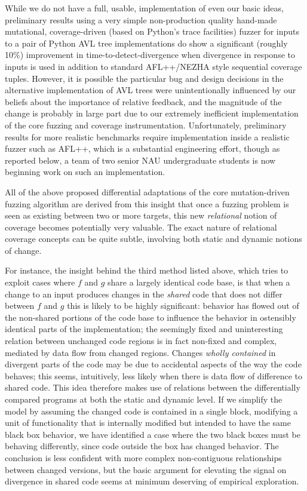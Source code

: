  While we do not have a full, usable, implementation of even our basic
 ideas,
 preliminary results using a very simple non-production quality hand-made
 mutational, coverage-driven  (based on Python's
 trace facilities)
 fuzzer for inputs to a pair of Python AVL tree implementations do show a
 significant (roughly 10\%) improvement in time-to-detect-divergence
 when divergence in response to inputs is used in addition to standard
 AFL++/NEZHA style sequential coverage tuples.  However, it is
 possible the particular bug and design decisions in the alternative
 implementation of AVL trees were unintentionally influenced by our beliefs about
 the importance of relative feedback, and the magnitude of the change
 is probably in large part due to our extremely inefficient
 implementation of the core fuzzing and coverage instrumentation.
 Unfortunately, preliminary results for more realistic benchmarks require
 implementation inside a realistic fuzzer such as AFL++, which is a
 substantial engineering effort, though as reported below, a team of
 two senior NAU undergraduate students is now beginning work on such
 an implementation.

 All of the above proposed differential adaptations of the core
 mutation-driven fuzzing algorithm are derived from this insight that
 once a fuzzing problem is seen as existing between two or more
 targets, this new \emph{relational} notion of coverage becomes
 potentially very valuable.  The exact nature of relational coverage
 concepts can be quite subtle, involving both static and dynamic
 notions of change.

 For instance, the insight behind the third method listed above, which tries to exploit
 cases where $f$ and $g$ share a largely identical code base, is that
 when a change to an input produces changes in the \emph{shared} code
 that does not differ between $f$ and $g$ this is likely to be highly
 significant:  behavior has flowed out of the non-shared portions of
 the code base to influence the behavior in ostensibly identical
 parts of the implementation; the seemingly fixed and uninteresting
 relation between unchanged code regions is in fact non-fixed and
 complex, mediated by data flow from changed regions.  Changes \emph{wholly contained} in divergent
 parts of the code may be due to accidental aspects of the way the
 code behaves; this seems,
 intuitively, less likely when there is data flow of difference to
 shared code.  This idea therefore makes use of relations between the
 differentially compared programs at both the static and dynamic
 level.  If we simplify the model by assuming the changed code
 is contained in a single block, modifying a unit of functionality
 that is internally modified but intended to have the same black box
 behavior, we have identified a case where the two black boxes must be
 behaving differently, since code outside the box has changed
 behavior.  The conclusion is less confident with more complex non-contiguous
 relationships between changed versions, but the basic argument for
 elevating the signal on divergence in shared code seems at minimum
 deserving of empirical exploration.

